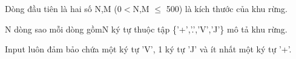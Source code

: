 Dòng đầu tiên là hai số N,M (0$<$N,M  $\le$ 500) là kích thước của khu rừng.  

   N dòng sao mỗi dòng gồmN ký tự thuộc tập \{'+','.','V','J'\} mô tả khu rừng.  

   Input luôn đảm bảo chứa một ký tự 'V', 1 ký tự 'J' và ít nhất một ký tự '+'.  

\